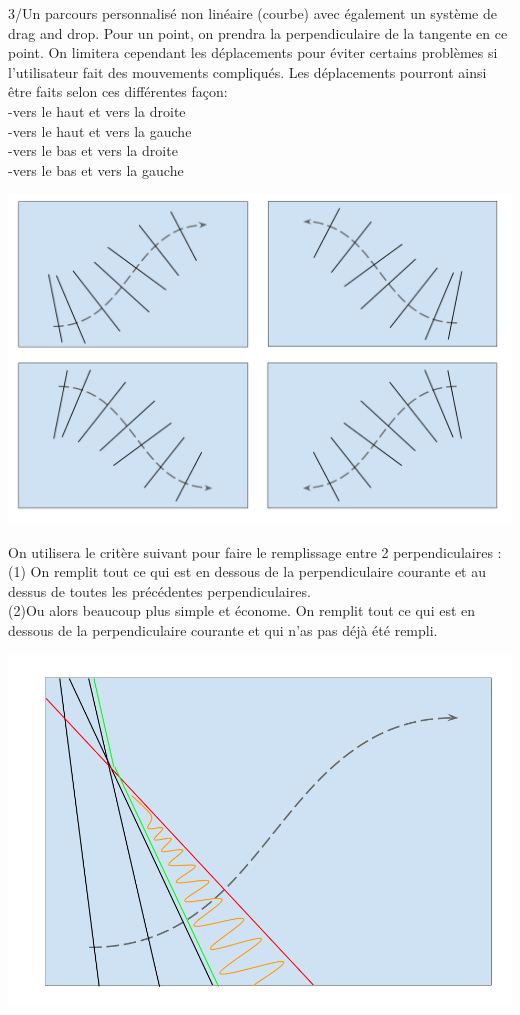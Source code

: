 \documentclass[a4paper,12pt]{report}
\begin{document}
3/Un parcours personnalisé non linéaire (courbe) avec également un système de drag and drop. Pour un point, on prendra la perpendiculaire de la tangente en ce point.
On limitera cependant les déplacements pour éviter certains problèmes si l’utilisateur fait des mouvements compliqués.
Les déplacements pourront ainsi être faits selon ces différentes façon:
\\\indent -vers le haut et vers la droite
\\\indent -vers le haut et vers la gauche 
\\\indent -vers le bas et vers la droite
\\\indent -vers le bas et vers la gauche
\begin{center}
 \includegraphics[scale=0.2]{./obturateur3.png}
\end{center}
On utilisera le critère suivant pour faire le remplissage entre 2 perpendiculaires :
\\\indent (1) On remplit tout ce qui est en dessous de la perpendiculaire courante et au dessus de toutes les précédentes perpendiculaires. 
\\\indent (2)Ou alors beaucoup plus simple et économe. On remplit tout ce qui est en dessous de la perpendiculaire courante et qui n’as pas déjà été rempli.
\begin{center}
 \includegraphics[scale=0.2]{./obturateur3exp.png}
\end{center}\par\bigskip
\end{document}
